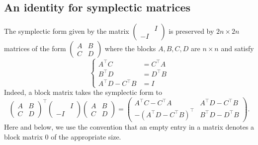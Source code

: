\documentclass[11pt]{amsart}
\theoremstyle{definition}
\numberwithin{figure}{section}
\numberwithin{equation}{section}
\numberwithin{table}{section}
\begin{document}
\subsection{An identity for symplectic matrices}
The symplectic form given by the matrix $\begin{pmatrix} & I \\ -I & \end{pmatrix}$ is preserved by $2n \times 2n$ matrices of the form
$
\begin{pmatrix} A & B \\ C & D \end{pmatrix}
$
where the blocks $A,B,C,D$ are $n \times n$ and satisfy
\begin{equation} \label{eqn:symplectic-abcd}
\left\{ 
\begin{aligned}
A^{\top}C &= C^{\top} A \\
B^{\top}D &= D^{\top} B \\
A^{\top}D - C^{\top}B &= I
\end{aligned}
\right.
\end{equation}
Indeed, a block matrix takes the symplectic form to
\[
\begin{pmatrix} A & B \\ C & D \end{pmatrix}^{\top}
\begin{pmatrix} & I \\ -I & \end{pmatrix}
\begin{pmatrix} A & B \\ C & D\end{pmatrix}
=
\begin{pmatrix}
A^{\top}C-C^{\top}A & A^{\top}D-C^{\top}B \\ -(A^{\top}D-C^{\top}B)^{\top} & B^{\top}D - D^{\top}B
\end{pmatrix}
.
\]
Here and below, we use the convention that an empty entry in a matrix denotes a block matrix $0$ of the appropriate size.
\end{document}
